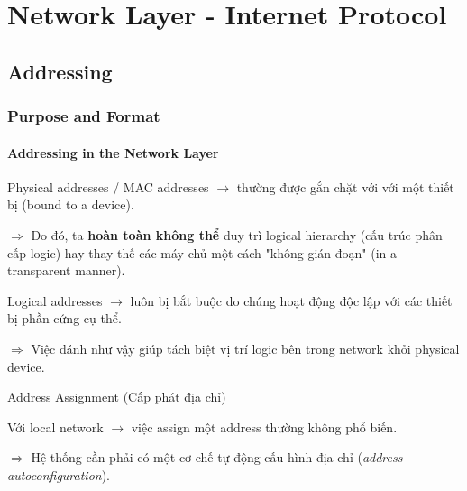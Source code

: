 \chapter{Network Layer - Internet Protocol}
\chapterminitoc

\section{Addressing}

\subsection{Purpose and Format}

\subsubsection{Addressing in the Network Layer}

Physical addresses / MAC addresses $\rightarrow$ thường được gắn chặt với với một thiết bị (bound to a device).

$\Rightarrow$ Do đó, ta \textbf{hoàn toàn không thể} duy trì logical hierarchy (cấu trúc phân cấp logic) hay thay thế các máy chủ một cách "không gián đoạn" (in a transparent manner).
\medskip

\noindent
Logical addresses $\rightarrow$ luôn bị bắt buộc do chúng hoạt động độc lập với các thiết bị phần cứng cụ thể.

$\Rightarrow$ Việc đánh như vậy giúp tách biệt vị trí logic bên trong network khỏi physical device.


\begin{mybox}{Address Assignment (Cấp phát địa chỉ)}

\noindent
Với local network $\rightarrow$ việc assign một address thường không phổ biến.

\noindent
$\Rightarrow$ Hệ thống cần phải có một cơ chế tự động cấu hình địa chỉ (\textit{address autoconfiguration}).
\end{mybox}

